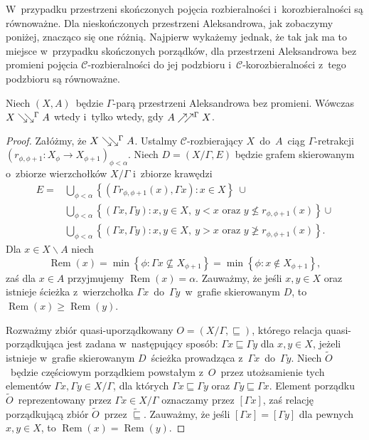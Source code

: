 W~przypadku przestrzeni skończonych pojęcia rozbieralności i~korozbieralności są równoważne. Dla nieskończonych przestrzeni Aleksandrowa, jak zobaczymy poniżej, znacząco się one różnią. 
Najpierw wykażemy jednak, że tak jak ma to miejsce w~przypadku skończonych porządków, dla przestrzeni Aleksandrowa bez promieni pojęcia $\mathcal{C}$-rozbieralności do jej podzbioru i~\mbox{$\mathcal{C}$-korozbieralności} z~tego podzbioru są równoważne.
\begin{tw}\label{build_if_dism}
Niech $(X,A)$~będzie $\Gamma$-parą przestrzeni Aleksandrowa bez promieni. Wówczas $X\searrow\!\!\searrow^\Gamma A$ wtedy i~tylko wtedy, gdy $A\nearrow\!\!\nearrow^\Gamma X$.
\end{tw}
\begin{proof}
Załóżmy, że $X\searrow\!\!\searrow^\Gamma A$. Ustalmy $\mathcal{C}$-rozbierający $X$~do~$A$~ciąg $\Gamma$-retrakcji $\left(r_{\phi,\phi+1}:X_\phi\to X_{\phi+1}\right)_{\phi<\alpha}$. Niech $D=\left(X\big/\Gamma,E\right)$ będzie grafem skierowanym o~zbiorze wierzchołków $X\big/\Gamma$ i~zbiorze krawędzi 
\begin{align*}E=&\bigcup_{\phi<\alpha}\left\{\left(\Gamma r_{\phi,\phi+1}(x),\Gamma x\right):x\in X\right\}\ \cup\\ &\bigcup_{\phi<\alpha}\left\{(\Gamma x,\Gamma y): x,y\in X,\ y < x\text{ oraz } y\not\leq r_{\phi,\phi+1}(x)\right\}\cup\\
&\bigcup_{\phi<\alpha}\left\{(\Gamma x,\Gamma y): x,y\in X,\ y> x \text{ oraz } y\not\geq r_{\phi,\phi+1}(x)\right\}.\end{align*}
Dla $x\in X\smallsetminus A$ niech \[\operatorname{Rem}(x)=\min\left\{\phi:\Gamma x\not\subseteq X_{\phi+1}\right\}=\min\left\{\phi:x\not\in X_{\phi+1}\right\},\] zaś dla $x\in A$ przyjmujemy $\operatorname{Rem}(x)=\alpha$. Zauważmy, że jeśli $x,y\in X$ oraz istnieje ścieżka z~wierzchołka $\Gamma x$~do~$\Gamma y$~w~grafie skierowanym $D$, to $\operatorname{Rem}(x)\geq\operatorname{Rem}(y)$. 

Rozważmy zbiór quasi-uporządkowany $O=\left(X\big/\Gamma,\sqsubseteq\right)$, którego relacja quasi-porządkująca jest zadana w~następujący sposób: $\Gamma x\sqsubseteq \Gamma y$ dla $x,y\in X$, jeżeli istnieje w~grafie skierowanym $D$~ścieżka prowadząca z~$\Gamma x$~do~$\Gamma y$. Niech $\widetilde{O}$~będzie częściowym porządkiem powstałym z~$O$~przez utożsamienie tych elementów $\Gamma x, \Gamma y\in X\big/\Gamma$, dla których $\Gamma x\sqsubseteq \Gamma y$ oraz $\Gamma y\sqsubseteq \Gamma x$. Element porządku $\widetilde{O}$~reprezentowany przez $\Gamma x\in X\big/\Gamma$ oznaczamy przez $[\Gamma x]$, zaś relację porządkującą zbiór $\widetilde{O}$~przez $\widetilde{\sqsubseteq}$.
Zauważmy, że jeśli $[\Gamma x]=[\Gamma y]$ dla pewnych $x,y\in X$, to $\operatorname{Rem}(x)=\operatorname{Rem}(y)$.


\end{proof}
